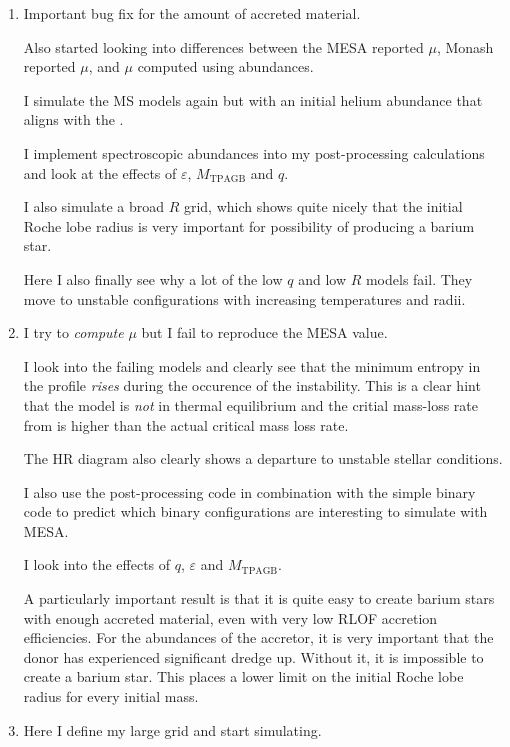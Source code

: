 \documentclass[a4paper,10pt]{article}
\begin{document}
\nextpage
\begin{enumerate}
	\item[\color{keywordscolor}30.] Important bug fix for the amount of accreted material.

	      Also started looking into differences between the MESA reported \(\mu \), Monash reported \(\mu \), and \(\mu \) computed using abundances.

	      I simulate the MS models again but with an initial helium abundance that aligns with the \citet{karakas2016}.

	      I implement spectroscopic abundances into my post-processing calculations and look at the effects
	      of \(\varepsilon \), \(M_\text{TPAGB}\) and \(q\).

	      I also simulate a broad \(R\) grid, which shows quite nicely that the initial Roche lobe radius
	      is very important for possibility of producing a barium star.

	      Here I also finally see why a lot of the low \(q\) and low \(R\) models fail.
	      They move to unstable configurations with increasing temperatures and radii.
	\item[\color{keywordscolor}31.] I try to \emph{compute} \(\mu \) but I fail to reproduce the MESA value.

	      I look into the failing models and clearly see that the minimum entropy in the profile \emph{rises} during the occurence of the instability.
	      This is a clear hint that the model is \emph{not} in thermal equilibrium and the critial mass-loss rate from \citet{temmink2022} is higher than the actual critical mass loss rate.

	      The HR diagram also clearly shows a departure to unstable stellar conditions.

	      I also use the post-processing code in combination with the simple binary code to predict
	      which binary configurations are interesting to simulate with MESA.

	      I look into the effects of \(q\), \(\varepsilon \) and \(M_\text{TPAGB} \).

	      A particularly important result is that it is quite easy to create barium stars with enough accreted
	      material, even with very low RLOF accretion efficiencies.
	      For the abundances of the accretor, it is very important that the donor has experienced significant dredge up.
	      Without it, it is impossible to create a barium star.
	      This places a lower limit on the initial Roche lobe radius for every initial mass.
	\item[\color{keywordscolor}32.] Here I define my large grid and start simulating.


\end{enumerate}
\end{document}
